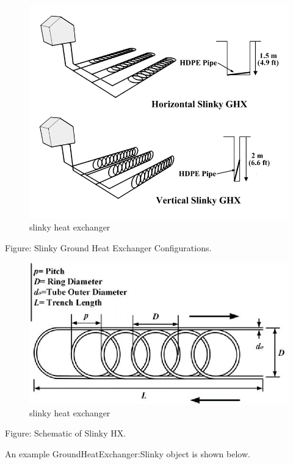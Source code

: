 \begin{figure}[htbp]
\centering
\includegraphics{media/image901.png}
\caption{slinky heat exchanger}
\end{figure}

Figure: Slinky Ground Heat Exchanger Configurations.

\begin{figure}[htbp]
\centering
\includegraphics{media/image902.png}
\caption{slinky heat exchanger}
\end{figure}

Figure: Schematic of Slinky HX.

An example GroundHeatExchanger:Slinky object is shown below.

